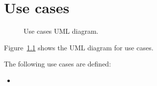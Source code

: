 \chapter{Use cases}

\begin{figure}[ht]
	\caption{Use cases UML diagram.}
	\label{fig:usecases}
\end{figure}

Figure~\ref{fig:usecases} shows the UML diagram for use cases.

The following use cases are defined:
\begin{itemize}
	\item \textellipsis
\end{itemize}
